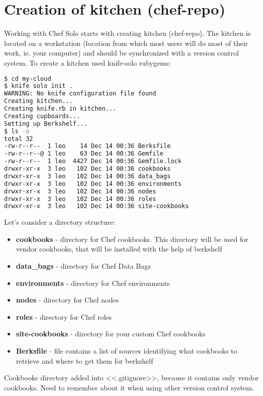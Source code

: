 \section{Creation of kitchen (chef-repo)}

Working with Chef Solo starts with creating kitchen (chef-repo). The kitchen is located on a workstation (location from which most users will do most of their work, ie. your computer) and should be synchronized with a version control system. To create a kitchen used knife-solo rubygems:

\begin{lstlisting}[language=Bash,label=lst:my-cloud-kitchen1,title=my-cloud]
$ cd my-cloud
$ knife solo init .
WARNING: No knife configuration file found
Creating kitchen...
Creating knife.rb in kitchen...
Creating cupboards...
Setting up Berkshelf...
$ ls -o
total 32
-rw-r--r--  1 leo    14 Dec 14 00:36 Berksfile
-rw-r--r--@ 1 leo    63 Dec 14 00:36 Gemfile
-rw-r--r--  1 leo  4427 Dec 14 00:36 Gemfile.lock
drwxr-xr-x  3 leo   102 Dec 14 00:36 cookbooks
drwxr-xr-x  3 leo   102 Dec 14 00:36 data_bags
drwxr-xr-x  3 leo   102 Dec 14 00:36 environments
drwxr-xr-x  3 leo   102 Dec 14 00:36 nodes
drwxr-xr-x  3 leo   102 Dec 14 00:36 roles
drwxr-xr-x  3 leo   102 Dec 14 00:36 site-cookbooks
\end{lstlisting}

Let's consider a directory structure:

\begin{itemize}
  \item \textbf{cookbooks} - directory for Chef cookbooks. This directory will be used for vendor cookbooks, that will be installed with the help of berkshelf
  \item \textbf{data\_bags} - directory for Chef Data Bags
  \item \textbf{environments} - directory for Chef environments
  \item \textbf{nodes} - directory for Chef nodes
  \item \textbf{roles} - directory for Chef roles
  \item \textbf{site-cookbooks} - directory for your custom Chef cookbooks
  \item \textbf{Berksfile} - file contains a list of sources identifying what cookbooks to retrieve and where to get them for berkshelf
\end{itemize}

Cookbooks directory added into <<.gitignore>>, because it contains only vendor cookbooks. Need to remember about it when using other version control system.
